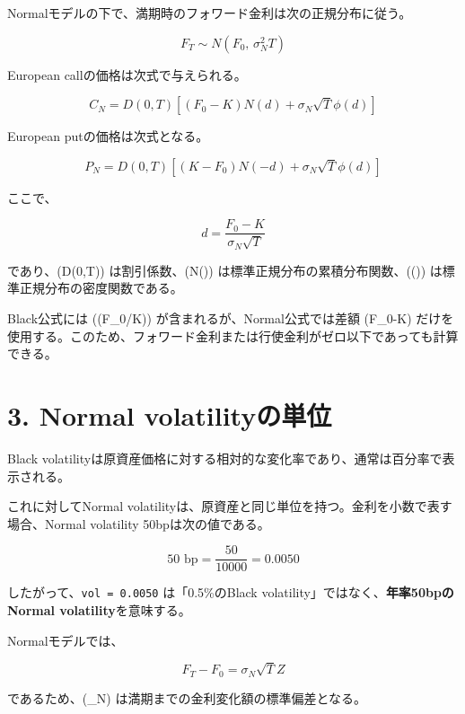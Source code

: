 \documentclass[
  letterpaper,
  DIV=11,
  numbers=noendperiod]{scrreprt}
\begin{document}
Normalモデルの下で、満期時のフォワード金利は次の正規分布に従う。

\[
F_T
\sim
N\left(
F_0,\,
\sigma_N^2T
\right)
\]

European callの価格は次式で与えられる。

\[
C_N
=
D(0,T)
\left[
(F_0-K)N(d)
+
\sigma_N\sqrt{T}\phi(d)
\right]
\]

European putの価格は次式となる。

\[
P_N
=
D(0,T)
\left[
(K-F_0)N(-d)
+
\sigma_N\sqrt{T}\phi(d)
\right]
\]

ここで、

\[
d
=
\frac{
F_0-K
}{
\sigma_N\sqrt{T}
}
\]

であり、(D(0,T)) は割引係数、(N(\cdot))
は標準正規分布の累積分布関数、(\phi(\cdot))
は標準正規分布の密度関数である。

Black公式には (\log(F\_0/K)) が含まれるが、Normal公式では差額 (F\_0-K)
だけを使用する。このため、フォワード金利または行使金利がゼロ以下であっても計算できる。

\section{3. Normal
volatilityの単位}\label{normal-volatilityux306eux5358ux4f4d}

Black
volatilityは原資産価格に対する相対的な変化率であり、通常は百分率で表示される。

これに対してNormal
volatilityは、原資産と同じ単位を持つ。金利を小数で表す場合、Normal
volatility 50bpは次の値である。

\[
50\text{ bp}
=
\frac{50}{10000}
=
0.0050
\]

したがって、\texttt{vol\ =\ 0.0050} は「0.5\%のBlack
volatility」ではなく、\textbf{年率50bpのNormal volatility}を意味する。

Normalモデルでは、

\[
F_T-F_0
=
\sigma_N\sqrt{T}Z
\]

であるため、(\sigma\_N) は満期までの金利変化額の標準偏差となる。
\end{document}
